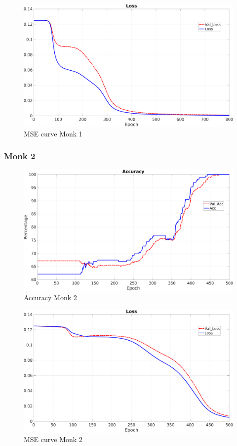 \begin{figure}[H]
\includegraphics[scale=0.2]{img/Monk1_loss.png}
\caption{MSE curve Monk 1}
\end{figure}


\subsubsection{Monk 2}
\begin{figure}[H]
\includegraphics[scale=0.2]{img/Monk2_accuracy.png}
\caption{Accuracy Monk 2}
\end{figure}

\begin{figure}[H]
\includegraphics[scale=0.2]{img/Monk2_loss.png}
\caption{MSE curve Monk 2}
\end{figure}

